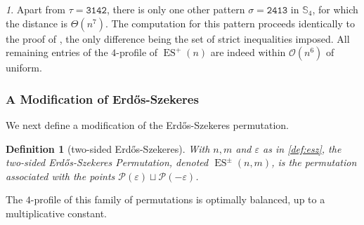 \documentclass{article}
\newtheorem{definition}[theorem]{Definition}
\DeclareMathOperator{\ES}{ES}
\newcommand{\ESZ}{Erd\H{o}s-Szekeres\xspace}
\theoremstyle{remark}
\newtheorem{rem}[theorem]{\protect\remarkname}
\providecommand{\remarkname}{Remark}
\theoremstyle{plain}
\begin{document}
\begin{rem}
    Apart from $\tau = \mathtt{3142}$, there is only one other pattern $\sigma = \mathtt{2413}$ in $\mathbb{S}_4$, for which the distance is $\Theta(n^7)$. The computation for this pattern proceeds identically to the proof of , the only difference being the set of strict inequalities imposed. All remaining entries of the $4$-profile of $\ES^+(n)$ are indeed within $\mathcal{O}(n^6)$ of uniform.
\end{rem}

\subsubsection{A Modification of \ESZ}
\label{subsect:es_mod}

We next define a modification of the \ESZ permutation.

\begin{definition} [two-sided \ESZ]
        With $n,m$ and $\varepsilon$ as in \cref{def:esz}, the two-sided \ESZ Permutation, denoted $\ES^\pm(n,m)$, is the permutation associated with the points $\mathcal{P}(\varepsilon) \sqcup \mathcal{P}(-\varepsilon)$.
\end{definition}

The $4$-profile of this family of permutations is optimally balanced, up to a multiplicative constant.
\end{document}
